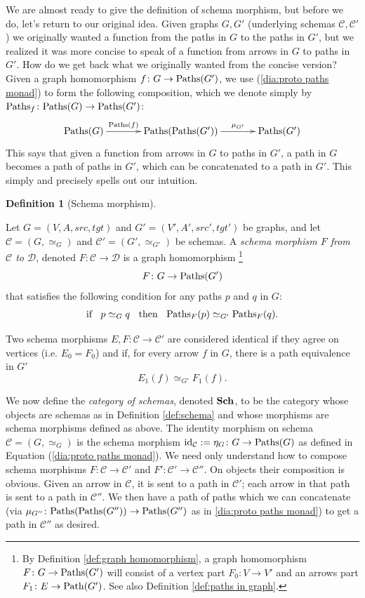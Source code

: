\documentclass{book}
\def\tn{\textnormal}
\def\mc{\mathcal}
\def\Path{\tn{Path}}
\def\Paths{\tn{Paths}}
\def\to{\rightarrow}
\def\taking{\colon}
\def\id{\tn{id}}
\def\mcC{\mc{C}}
\def\mcD{\mc{D}}
\theoremstyle{remark}
\theoremstyle{definition}
\newtheorem{definition}[subsubsection]{Definition}
\def\Sch{{\bf Sch}}
\begin{document}
We are almost ready to give the definition of schema morphism, but before we do, let's return to our original idea. Given graphs $G,G'$ (underlying schemas $\mcC,\mcC'$) we originally wanted a function from the paths in $G$ to the paths in $G'$, but we realized it was more concise to speak of a function from arrows in $G$ to paths in $G'$. How do we get back what we originally wanted from the concise version? Given a graph homomorphism $f\taking G\to\Paths(G')$, we use (\ref{dia:proto paths monad}) to form the following composition, which we denote simply by $\Paths_f\taking\Paths(G)\to\Paths(G')$:
\begin{align}\label{dia:kleisli comp in graph}
\xymatrix@=35pt{\Paths(G)\ar[r]^-{\Paths(f)}&\Paths(\Paths(G'))\ar[r]^-{\mu_{G'}}&\Paths(G')}
\end{align}
This says that given a function from arrows in $G$ to paths in $G'$, a path in $G$ becomes a path of paths in $G'$, which can be concatenated to a path in $G'$. This simply and precisely spells out our intuition.

\begin{definition}[Schema morphism]\label{def:schema morphism}

Let $G=(V,A,src,tgt)$ and $G'=(V',A',src',tgt')$ be graphs, and let $\mcC=(G,\simeq_G)$ and $\mcC'=(G',\simeq_{G'})$ be schemas. A {\em schema morphism $F$ from $\mcC$ to $\mcD$}, denoted $F\taking\mcC\to\mcD$ is a graph homomorphism 
\footnote{By Definition \ref{def:graph homomorphism}, a graph homomorphism $F\taking G\to\Paths(G')$ will consist of a vertex part $F_0\taking V\to V'$ and an arrows part $F_1\taking E\to\Path(G')$. See also Definition \ref{def:paths in graph}.}
$$F\taking G\to\Paths(G')$$ that satisfies the following condition for any paths $p$ and $q$ in $G$: 
\begin{align}\label{dia:path cond for schema morphism}
\tn{if \;\;$p\simeq_G q$ \;\;then\;\; $\Paths_F(p)\simeq_{G'}\Paths_F(q)$}.
\end{align}

Two schema morphisms $E,F\taking\mcC\to\mcC'$ are considered identical if they agree on vertices (i.e. $E_0=F_0$) and if, for every arrow $f$ in $G$, there is a path equivalence in $G'$ $$E_1(f)\simeq_{G'}F_1(f).$$

We now define the {\em category of schemas}, denoted $\Sch$,\index{a category!$\Sch$} to be the category whose objects are schemas as in Definition \ref{def:schema} and whose morphisms are schema morphisms defined as above. The identity morphism on schema $\mcC=(G,\simeq_G)$ is the schema morphism $\id_\mcC:=\eta_G\taking G\to\Paths(G)$ as defined in Equation (\ref{dia:proto paths monad}). We need only understand how to compose schema morphisms $F\taking\mcC\to\mcC'$ and $F'\taking\mcC'\to\mcC''$. On objects their composition is obvious. Given an arrow in $\mcC$, it is sent to a path in $\mcC'$; each arrow in that path is sent to a path in $\mcC''$. We then have a path of paths which we can concatenate (via $\mu_{G''}\taking\Paths(\Paths(G''))\to\Paths(G'')$ as in \ref{dia:proto paths monad}) to get a path in $\mcC''$ as desired.

\end{definition}
\end{document}
